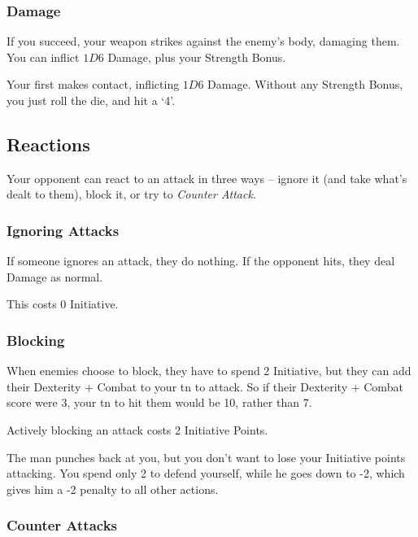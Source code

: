 \begin{multicols}{2}
\subsubsection{Damage}

If you succeed, your weapon strikes against the enemy's body, damaging them.
You can inflict $1D6$ Damage, plus your Strength Bonus.

\begin{exampletext}
  Your first makes contact, inflicting $1D6$ Damage.
  Without any Strength Bonus, you just roll the die, and hit a `4'.
\end{exampletext}

\subsection{Reactions}

Your opponent can react to an attack in three ways -- ignore it (and take what's dealt to them), block it, or try to \textit{Counter Attack}.

\subsubsection{Ignoring Attacks}

If someone ignores an attack, they do nothing.
If the opponent hits, they deal Damage as normal.

This costs 0 Initiative.

\subsubsection{Blocking}

When enemies choose to block, they have to spend 2 Initiative, but they can add their Dexterity + Combat to your \gls{tn} to attack.
So if their Dexterity + Combat score were 3, your \gls{tn} to hit them would be 10, rather than 7.

Actively blocking an attack costs 2 Initiative Points.

\begin{exampletext}
  The man punches back at you, but you don't want to lose your Initiative points attacking.
  You spend only 2 to defend yourself, while he goes down to -2, which gives him a -2 penalty to all other actions.
\end{exampletext}

\subsubsection{Counter Attacks}


\end{multicols}
